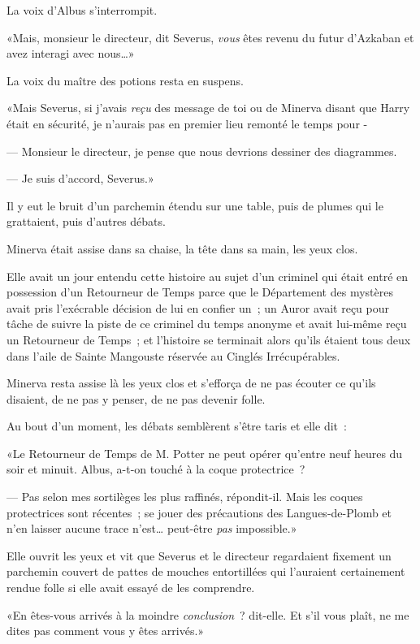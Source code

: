 La voix d'Albus s'interrompit.

«Mais, monsieur le directeur, dit Severus, \emph{vous} êtes revenu du futur d'Azkaban et avez interagi avec nous…»

La voix du maître des potions resta en suspens.

«Mais Severus, si j'avais \emph{reçu} des message de toi ou de Minerva disant que Harry était en sécurité, je n'aurais pas en premier lieu remonté le temps pour -

--- Monsieur le directeur, je pense que nous devrions dessiner des diagrammes.

--- Je suis d'accord, Severus.»

Il y eut le bruit d'un parchemin étendu sur une table, puis de plumes qui le grattaient, puis d'autres débats.

Minerva était assise dans sa chaise, la tête dans sa main, les yeux clos.

Elle avait un jour entendu cette histoire au sujet d'un criminel qui était entré en possession d'un Retourneur de Temps parce que le Département des mystères avait pris l'exécrable décision de lui en confier un~; un Auror avait reçu pour tâche de suivre la piste de ce criminel du temps anonyme et avait lui-même reçu un Retourneur de Temps~; et l'histoire se terminait alors qu'ils étaient tous deux dans l'aile de Sainte Mangouste réservée au Cinglés Irrécupérables.

Minerva resta assise là les yeux clos et s'efforça de ne pas écouter ce qu'ils disaient, de ne pas y penser, de ne pas devenir folle.

Au bout d'un moment, les débats semblèrent s'être taris et elle dit~:

«Le Retourneur de Temps de M. Potter ne peut opérer qu'entre neuf heures du soir et minuit. Albus, a-t-on touché à la coque protectrice~?

--- Pas selon mes sortilèges les plus raffinés, répondit-il. Mais les coques protectrices sont récentes~; se jouer des précautions des Langues-de-Plomb et n'en laisser aucune trace n'est… peut-être \emph{pas} impossible.»

Elle ouvrit les yeux et vit que Severus et le directeur regardaient fixement un parchemin couvert de pattes de mouches entortillées qui l'auraient certainement rendue folle si elle avait essayé de les comprendre.

«En êtes-vous arrivés à la moindre \emph{conclusion}~? dit-elle. Et s'il vous plaît, ne me dites pas comment vous y êtes arrivés.»

